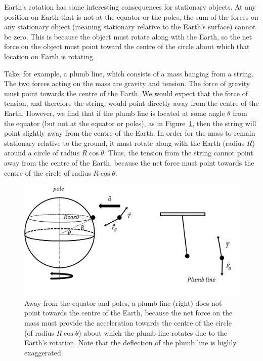 Earth's rotation has some interesting consequences for stationary objects. At any position on Earth that is not at the equator or the poles, the sum of the forces on any stationary object (meaning stationary relative to the Earth's surface) cannot be zero. This is because the object must rotate along with the Earth, so the net force on the object must point toward the centre of the circle about which that location on Earth is rotating.

Take, for example, a plumb line, which consists of a mass hanging from a string. The two forces acting on the mass are gravity and tension. The force of gravity must point towards the centre of the Earth. We would expect that the force of tension, and therefore the string, would point directly away from the centre of the Earth. However, we find that if the plumb line is located at some angle $\theta$ from the equator (but not at the equator or poles), as in Figure~\ref{fig:gravity:apparentweight2}, then the string will point slightly away from the centre of the Earth.  In order for the mass to remain stationary relative to the ground, it must rotate along with the Earth (radius $R$) around a circle of radius $R\cos\theta$.   Thus, the tension from the string cannot point away from the centre of the Earth, because the net force must point towards the centre of the circle of radius $R\cos\theta$.

\begin{figure}[!htbp]
\centering
\includegraphics[width=0.8\linewidth]{files/apparentweight2-c000843b2433473a77dfad5122536b17.png}
\caption[]{Away from the equator and poles, a plumb line (right) does not point towards the centre of the Earth, because the net force on the mass must provide the acceleration towards the centre of the circle (of radius $R\cos\theta$) about which the plumb line rotates due to the Earth's rotation. Note that the deflection of the plumb line is highly exaggerated.}
\label{fig:gravity:apparentweight2}
\end{figure}

